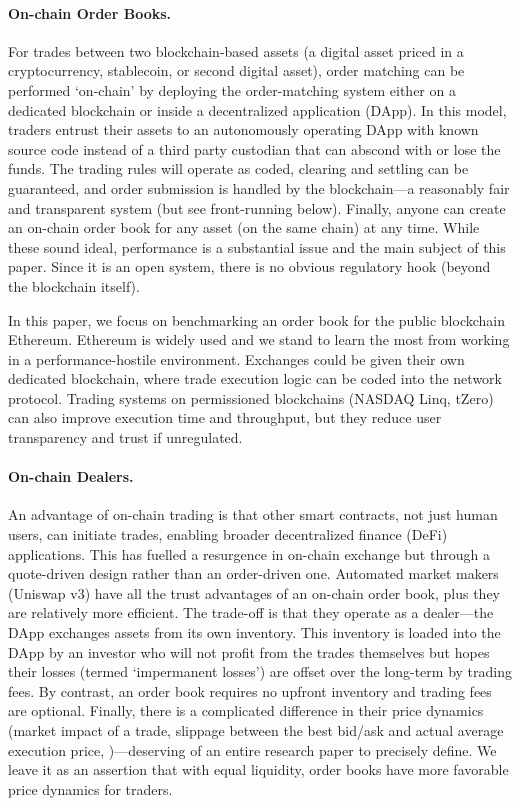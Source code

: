 \paragraph{On-chain Order Books.} For trades between two blockchain-based assets (\eg a digital asset priced in a cryptocurrency, stablecoin, or second digital asset), order matching can be performed `on-chain' by deploying the order-matching system either on a dedicated blockchain or inside a decentralized application (DApp). In this model, traders entrust their assets to an autonomously operating DApp with known source code instead of a third party custodian that can abscond with or lose the funds. The trading rules will operate as coded, clearing and settling can be guaranteed, and order submission is handled by the blockchain---a reasonably fair and transparent system (but see front-running below). Finally, anyone can create an on-chain order book for any asset (on the same chain) at any time. While these sound ideal, performance is a substantial issue and the main subject of this paper. Since it is an open system, there is no obvious regulatory hook (beyond the blockchain itself).

In this paper, we focus on benchmarking an order book for the public blockchain Ethereum. Ethereum is widely used and we stand to learn the most from working in a performance-hostile environment. Exchanges could be given their own dedicated blockchain, where trade execution logic can be coded into the network protocol. Trading systems on permissioned blockchains (\eg NASDAQ Linq, tZero) can also improve execution time and throughput, but they reduce user transparency and trust if unregulated.

\paragraph{On-chain Dealers.} An advantage of on-chain trading is that other smart contracts, not just human users, can initiate trades, enabling broader decentralized finance (DeFi) applications. This has fuelled a resurgence in on-chain exchange but through a quote-driven design rather than an order-driven one. Automated market makers  (\eg Uniswap v3) have all the trust advantages of an on-chain order book, plus they are relatively more efficient. The trade-off is that they operate as a dealer---the DApp exchanges assets from its own inventory. This inventory is loaded into the DApp by an investor who will not profit from the trades themselves but hopes their losses (termed `impermanent losses') are offset over the long-term by trading fees. By contrast, an order book requires no upfront inventory and trading fees are optional. Finally, there is a complicated difference in their price dynamics (\eg market impact of a trade, slippage between the best bid/ask and actual average execution price, \etc)---deserving of an entire research paper to precisely define. We leave it as an assertion that with equal liquidity, order books have more favorable price dynamics for traders.

